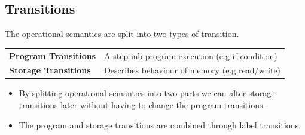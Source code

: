 \subsection{Transitions}
The operational semantics are split into two types of transition.
\begin{center}
    \begin{tabular}{l p{}}
        \textbf{Program Transitions} & A step inb program execution (e.g if condition) \\
        \textbf{Storage Transitions} & Describes behaviour of memory (e.g read/write) \\
    \end{tabular}
\end{center}
\begin{itemize}
    \item By splitting operational semantics into two parts we can alter storage transitions later without having to change the program transitions.
    \item The program and storage transitions are combined through label transitions.
\end{itemize}


